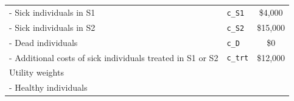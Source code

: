 \documentclass[
]{article}
\begin{document}
\begin{longtable}[]{@{}llc@{}}
\begin{minipage}[t]{0.51\columnwidth}
- Sick individuals in S1\strut
\end{minipage} & \begin{minipage}[t]{0.19\columnwidth}\raggedright
\texttt{c\_S1}\strut
\end{minipage} & \begin{minipage}[t]{0.21\columnwidth}\centering
\$4,000\strut
\end{minipage}\tabularnewline
\begin{minipage}[t]{0.51\columnwidth}\raggedright
- Sick individuals in S2\strut
\end{minipage} & \begin{minipage}[t]{0.19\columnwidth}\raggedright
\texttt{c\_S2}\strut
\end{minipage} & \begin{minipage}[t]{0.21\columnwidth}\centering
\$15,000\strut
\end{minipage}\tabularnewline
\begin{minipage}[t]{0.51\columnwidth}\raggedright
- Dead individuals\strut
\end{minipage} & \begin{minipage}[t]{0.19\columnwidth}\raggedright
\texttt{c\_D}\strut
\end{minipage} & \begin{minipage}[t]{0.21\columnwidth}\centering
\$0\strut
\end{minipage}\tabularnewline
\begin{minipage}[t]{0.51\columnwidth}\raggedright
- Additional costs of sick individuals treated in S1 or S2\strut
\end{minipage} & \begin{minipage}[t]{0.19\columnwidth}\raggedright
\texttt{c\_trt}\strut
\end{minipage} & \begin{minipage}[t]{0.21\columnwidth}\centering
\$12,000\strut
\end{minipage}\tabularnewline
\begin{minipage}[t]{0.51\columnwidth}\raggedright
Utility weights\strut
\end{minipage} & \begin{minipage}[t]{0.19\columnwidth}\raggedright
\strut
\end{minipage} & \begin{minipage}[t]{0.21\columnwidth}\centering
\strut
\end{minipage}\tabularnewline
\begin{minipage}[t]{0.51\columnwidth}\raggedright
- Healthy individuals\strut

\end{minipage}
\end{longtable}
\end{document}
